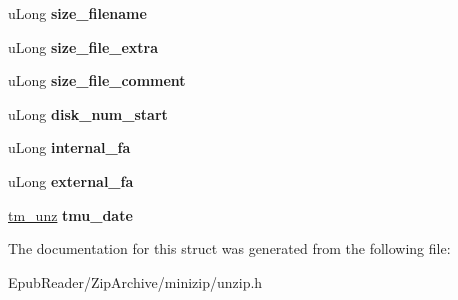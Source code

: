 \begin{DoxyCompactItemize}
\item 
\hypertarget{structunz__file__info__s_ae4f2f81a5301f7df9014838a56a496c6}{u\-Long {\bfseries size\-\_\-filename}}\label{structunz__file__info__s_ae4f2f81a5301f7df9014838a56a496c6}

\item 
\hypertarget{structunz__file__info__s_a479402dcb3555c922e3ce87c8f967990}{u\-Long {\bfseries size\-\_\-file\-\_\-extra}}\label{structunz__file__info__s_a479402dcb3555c922e3ce87c8f967990}

\item 
\hypertarget{structunz__file__info__s_afa9feffb3b9c9c03e02599118d5f548e}{u\-Long {\bfseries size\-\_\-file\-\_\-comment}}\label{structunz__file__info__s_afa9feffb3b9c9c03e02599118d5f548e}

\item 
\hypertarget{structunz__file__info__s_ab7bfba2b7d0cdb7260a7cd9f9ccd00ff}{u\-Long {\bfseries disk\-\_\-num\-\_\-start}}\label{structunz__file__info__s_ab7bfba2b7d0cdb7260a7cd9f9ccd00ff}

\item 
\hypertarget{structunz__file__info__s_aa20738bf82bca71cc950b9475b5d8c3c}{u\-Long {\bfseries internal\-\_\-fa}}\label{structunz__file__info__s_aa20738bf82bca71cc950b9475b5d8c3c}

\item 
\hypertarget{structunz__file__info__s_ae3365fdb260668fca60bfb975b1513aa}{u\-Long {\bfseries external\-\_\-fa}}\label{structunz__file__info__s_ae3365fdb260668fca60bfb975b1513aa}

\item 
\hypertarget{structunz__file__info__s_ad52c08c65349f674b00244d81cdb1736}{\hyperlink{structtm__unz__s}{tm\-\_\-unz} {\bfseries tmu\-\_\-date}}\label{structunz__file__info__s_ad52c08c65349f674b00244d81cdb1736}

\end{DoxyCompactItemize}


The documentation for this struct was generated from the following file\-:\begin{DoxyCompactItemize}
\item 
Epub\-Reader/\-Zip\-Archive/minizip/unzip.\-h\end{DoxyCompactItemize}
